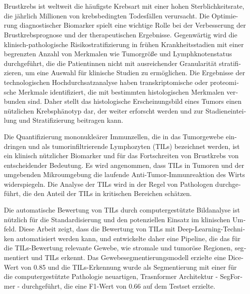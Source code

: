 \makeatletter
{}
{\renewcommand{\abstractname}{Kurzfassung}}
{\renewcommand{\abstractname}{Abstract}}
\makeatother

\chapter{\abstractname}

\begin{otherlanguage}{ngerman} 
Brustkrebs ist weltweit die häufigste Krebsart mit einer hohen Sterblichkeitsrate,
die jährlich Millionen von krebsbedingten Todesfällen verursacht.
Die Optimierung diagnostischer Biomarker spielt eine wichtige Rolle bei der Verbesserung der
Brustkrebsprognose und der therapeutischen Ergebnisse.
Gegenwärtig wird die klinisch-pathologische Risikostratifizierung in frühen Krankheitsstadien
mit einer begrenzten Anzahl von Merkmalen wie Tumorgröße und Lymphknotenstatus durchgeführt,
die die Patientinnen nicht mit ausreichender Granularität stratifizieren, um eine Auswahl für
klinische Studien zu ermöglichen. 
Die Ergebnisse der technologischen Hochdurchsatzanalyse haben transkriptomische oder
proteomische Merkmale identifiziert, die mit bestimmten histologischen Merkmalen verbunden sind. 
Daher stellt das histologische Erscheinungsbild eines Tumors einen nützlichen Krebsphänotyp
dar, der weiter erforscht werden und zur Stadieneinteilung und Stratifizierung beitragen kann.

Die Quantifizierung mononukleärer Immunzellen, die in das Tumorgewebe eindringen und als
tumorinfiltrierende Lymphozyten (TILs) bezeichnet werden, ist ein klinisch nützlicher Biomarker
und für das Fortschreiten von Brustkrebs von entscheidender Bedeutung. Es wird angenommen,
dass TILs in Tumoren und der umgebenden Mikroumgebung die laufende Anti-Tumor-Immunreaktion
des Wirts widerspiegeln.
Die Analyse der TILs wird in der Regel von Pathologen durchgeführt,
die den Anteil der TILs in kritischen Bereichen schätzen.

Die automatische Bewertung von TILs durch computergestützte Bildanalyse ist nützlich
für die Standardisierung und den potenziellen Einsatz im klinischen Umfeld.
Diese Arbeit zeigt, dass die Bewertung von TILs mit Deep-Learning-Techniken automatisiert
werden kann, und entwickelte daher eine Pipeline, die das für die TILs-Bewertung relevante Gewebe,
wie stromale und tumoröse Regionen, segmentiert und TILs erkennt. Das Gewebesegmentierungsmodell erzielte eine
Dice-Wert von 0.85 und die TILs-Erkennung wurde als Segmentierung mit einer für die
computergestützte Pathologie neuartigen, Trasnformer Architektur - SegFormer - durchgeführt,
die eine F1-Wert von 0.66 auf dem Testset erzielte.


\end{otherlanguage}
